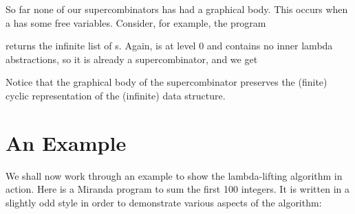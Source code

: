 So far none of our supercombinators has had a graphical body. This occurs
when a  has some free variables. Consider, for example, the program


\noindent
{} returns the infinite list of s. Again,  is at level 0 and contains no inner
lambda abstractions, so it is already a supercombinator, and we get


\noindent
Notice that the graphical body of the supercombinator preserves the (finite)
cyclic representation of the (infinite) data structure.

\section{An Example}

We shall now work through an example to show the lambda-lifting algorithm
in action. Here is a Miranda program to sum the first 100 integers. It is written
in a slightly odd style in order to demonstrate various aspects of the algorithm:


